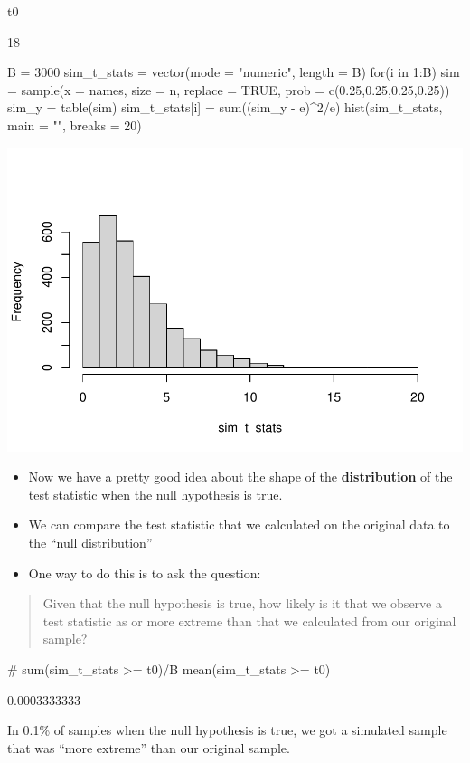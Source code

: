 \documentclass[a4paper]{article}\usepackage[]{graphicx}\usepackage[]{xcolor}
\makeatletter
\def\maxwidth{ %
  \ifdim\Gin@nat@width>\linewidth
    \linewidth
  \else
    \Gin@nat@width
  \fi
}
\makeatother
\begin{document}
\begin{Schunk}
\begin{Sinput}
t0
\end{Sinput}
\begin{Soutput}
[1] 18
\end{Soutput}
\end{Schunk}
\begin{Schunk}
\begin{Sinput}
B = 3000
sim_t_stats = vector(mode = "numeric", length = B)
for(i in 1:B){
  sim = sample(x = names, size = n,
  replace = TRUE, prob = c(0.25,0.25,0.25,0.25))
  sim_y = table(sim)
  sim_t_stats[i] = sum((sim_y - e)^2/e)
}
hist(sim_t_stats, main = "", breaks = 20)
\end{Sinput}


{\centering \includegraphics[width=\maxwidth]{figure/listings-unnamed-chunk-21-1} 

}

\end{Schunk}
\begin{itemize}
	\item Now we have a pretty good idea about the shape of the \textbf{distribution} of the test statistic \textcolor{mygreen}{when the null hypothesis is true}.
	\item We can compare the test statistic that we calculated on the original data to the \textcolor{mygreen}{``null distribution''}
	\item One way to do this is to ask the question:
\end{itemize}
\begin{quote}
	Given that the \textcolor{mygreen}{null hypothesis is true}, how likely is it that we observe a test statistic as or more extreme than that we calculated from our original sample?
\end{quote}
\begin{Schunk}
\begin{Sinput}
# sum(sim_t_stats >= t0)/B
mean(sim_t_stats >= t0)
\end{Sinput}
\begin{Soutput}
[1] 0.0003333333
\end{Soutput}
\end{Schunk}
In 0.1\% of samples when the null hypothesis is true, we got a simulated sample that was ``more extreme'' than our original sample.
\end{document}
